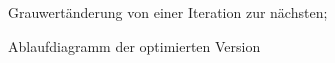 \documentclass[a4paper,12pt]{article}
\begin{document}
\begin{figure}[htbp]
\caption{Grauwertänderung von einer Iteration zur nächsten;}%
\label{figure_konv_verhalten}
\end{figure}




 
\begin{figure}[htbp]
\caption{Ablaufdiagramm der optimierten Version}%
\label{figure_konverg_ablauf}
\end{figure}
\end{document}
